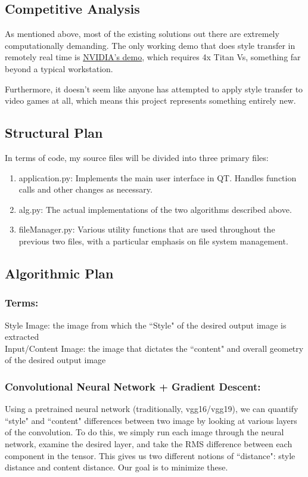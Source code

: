 \documentclass[12pt]{article}
\begin{document}
\subsection{Competitive Analysis}
    As mentioned above, most of the existing solutions out there are extremely computationally demanding.
    The only working demo that does style transfer in remotely real time is \href{https://www.youtube.com/watch?v=vAelubuwquE}{NVIDIA's demo}, which requires 4x Titan Vs, something far beyond a typical workstation.
    
    Furthermore, it doesn't seem like anyone has attempted to apply style transfer to video games at all, which means this project represents something entirely new.
\subsection{Structural Plan}
    In terms of code, my source files will be divided into three primary files:
    \begin{enumerate}
        \item application.py: Implements the main user interface in QT. Handles function calls and other changes as necessary.
        \item alg.py: The actual implementations of the two algorithms described above.
        \item fileManager.py: Various utility functions that are used throughout the previous two files, with a particular emphasis on file system management.
    \end{enumerate}
\subsection{Algorithmic Plan}

    \subsubsection{Terms:}
    Style Image: the image from which the ``Style" of the desired output image is extracted\\
    Input/Content Image: the image that dictates the ``content" and overall geometry of the desired output image\\

    \subsubsection{Convolutional Neural Network + Gradient Descent:}
    Using a pretrained neural network (traditionally, vgg16/vgg19), we can quantify ``style" and ``content" differences between two image by looking at various layers of the convolution. To do this, we simply run each image through the neural network, examine the desired layer, and take the RMS difference between each component in the tensor. 
    This gives us two different notions of ``distance": style distance and content distance. Our goal is to minimize these. 
\end{document}
